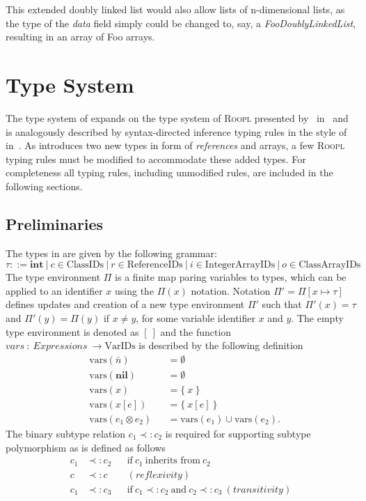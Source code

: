 This extended doubly linked list would also allow lists of n-dimensional lists, as the type of the \textit{data} field simply could be changed to, say, a \textit{FooDoublyLinkedList}, resulting in an array of Foo arrays. 


\newpage
\section{Type System}
\label{sec:type-system}
The type system of \rooplpp expands on the type system of \textsc{Roopl} presented by~\citeauthor{th:roopl} in~\cite{th:roopl} and is analogously described by syntax-directed inference typing rules in the style of ~\citeauthor{wi:semantics} in~\cite{wi:semantics}. As \rooplpp introduces two new types in form of \textit{references} and arrays, a few \textsc{Roopl} typing rules must be modified to accommodate these added types. For completeness all typing rules, including unmodified rules, are included in the following sections. 

\subsection{Preliminaries}
\label{subsec:preliminaries}
The types in \rooplpp are given by the following grammar:
\begin{equation*}
    \tau ::= \textbf{int}\ |\ c \in \text{ClassIDs}\ |\ r \in \text{ReferenceIDs}\ |\ i \in \text{IntegerArrayIDs}\ |\ o \in \text{ClassArrayIDs}
\end{equation*}
The type environment $\Pi$ is a finite map paring variables to types, which can be applied to an identifier $x$ using the $\Pi(x)$ notation. Notation $\Pi' = \Pi[x \mapsto \tau]$ defines updates and creation of a new type environment $\Pi'$ such that $\Pi'(x) = \tau$ and $\Pi'(y) = \Pi(y)$ if $x \not= y$, for some variable identifier $x$ and $y$. The empty type environment is denoted as $[\ ]$ and the function $vars\ :\ Expressions\ \to \text{VarIDs}$ is described by the following definition
\begin{align*}
    &\text{vars}(\bar{n}) &&= \emptyset\\
    &\text{vars}(\textbf{nil}) &&= \emptyset\\
    &\text{vars}(x) &&= \{\ x\ \}\\
    &\text{vars}(x[e]) &&= \{\ x[e]\ \}\\
    &\text{vars}(e_1 \otimes e_2) &&= \text{vars}(e_1) \cup \text{vars}(e_2).
\end{align*}
The binary subtype relation $c_1 \prec: c_2$ is required for supporting subtype polymorphism as is defined as follows
\begin{align*}
    c_1 &\prec: c_2 &&\text{if}\ c_1\ \text{inherits from}\ c_2\\
    c   &\prec: c   &&(reflexivity)\\
    c_1 &\prec: c_3 &&\text{if}\ c_1 \prec: c_2\ \text{and}\ c_2 \prec: c_3\ (transitivity)
\end{align*}

